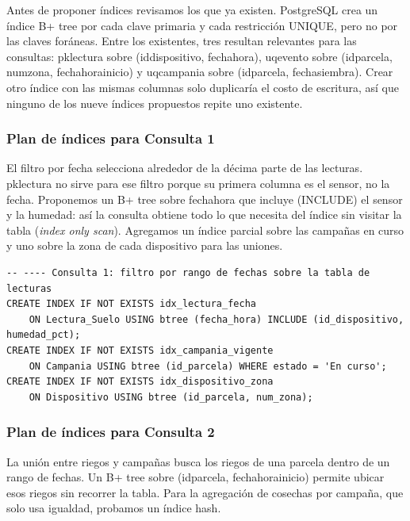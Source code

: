\documentclass[11pt,letterpaper]{article}
\newcommand{\tbus}{\textunderscore\allowbreak}
\newcommand{\tb}[1]{{\ttfamily\let\_\tbus #1}}
\begin{document}
Antes de proponer índices revisamos los que ya existen. PostgreSQL crea un índice B+ tree por cada clave primaria y cada restricción \tb{UNIQUE}, pero no por las claves foráneas. Entre los existentes, tres resultan relevantes para las consultas: \tb{pk\_lectura} sobre (\tb{id\_dispositivo}, \tb{fecha\_hora}), \tb{uq\_evento} sobre (\tb{id\_parcela}, \tb{num\_zona}, \tb{fecha\_hora\_inicio}) y \tb{uq\_campania} sobre (\tb{id\_parcela}, \tb{fecha\_siembra}). Crear otro índice con las mismas columnas solo duplicaría el costo de escritura, así que ninguno de los nueve índices propuestos repite uno existente.

\subsubsection{Plan de índices para Consulta 1}

El filtro por fecha selecciona alrededor de la décima parte de las lecturas. \tb{pk\_lectura} no sirve para ese filtro porque su primera columna es el sensor, no la fecha. Proponemos un B+ tree sobre \tb{fecha\_hora} que incluye (\tb{INCLUDE}) el sensor y la humedad: así la consulta obtiene todo lo que necesita del índice sin visitar la tabla (\emph{index only scan}). Agregamos un índice parcial sobre las campañas en curso y uno sobre la zona de cada dispositivo para las uniones.

\begin{lstlisting}[style=sql]
-- ---- Consulta 1: filtro por rango de fechas sobre la tabla de lecturas
CREATE INDEX IF NOT EXISTS idx_lectura_fecha
    ON Lectura_Suelo USING btree (fecha_hora) INCLUDE (id_dispositivo, humedad_pct);
CREATE INDEX IF NOT EXISTS idx_campania_vigente
    ON Campania USING btree (id_parcela) WHERE estado = 'En curso';
CREATE INDEX IF NOT EXISTS idx_dispositivo_zona
    ON Dispositivo USING btree (id_parcela, num_zona);
\end{lstlisting}


\subsubsection{Plan de índices para Consulta 2}

La unión entre riegos y campañas busca los riegos de una parcela dentro de un rango de fechas. Un B+ tree sobre (\tb{id\_parcela}, \tb{fecha\_hora\_inicio}) permite ubicar esos riegos sin recorrer la tabla. Para la agregación de cosechas por campaña, que solo usa igualdad, probamos un índice hash.
\end{document}
